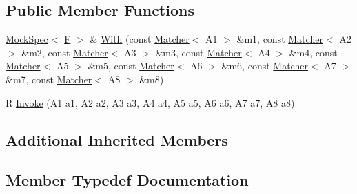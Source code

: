 \subsection*{Public Member Functions}
\begin{DoxyCompactItemize}
\item 
\hyperlink{classtesting_1_1internal_1_1_mock_spec}{Mock\+Spec}$<$ \hyperlink{classtesting_1_1internal_1_1_function_mocker_3_01_r_07_a1_00_01_a2_00_01_a3_00_01_a4_00_01_a5_00_01_a6_00_01_a7_00_01_a8_08_4_ad9749c93b0a17540778c5fa162a5fe6c}{F} $>$ \& \hyperlink{classtesting_1_1internal_1_1_function_mocker_3_01_r_07_a1_00_01_a2_00_01_a3_00_01_a4_00_01_a5_00_01_a6_00_01_a7_00_01_a8_08_4_ab2da711e67ed57fbd473cfc511935927}{With} (const \hyperlink{classtesting_1_1_matcher}{Matcher}$<$ A1 $>$ \&m1, const \hyperlink{classtesting_1_1_matcher}{Matcher}$<$ A2 $>$ \&m2, const \hyperlink{classtesting_1_1_matcher}{Matcher}$<$ A3 $>$ \&m3, const \hyperlink{classtesting_1_1_matcher}{Matcher}$<$ A4 $>$ \&m4, const \hyperlink{classtesting_1_1_matcher}{Matcher}$<$ A5 $>$ \&m5, const \hyperlink{classtesting_1_1_matcher}{Matcher}$<$ A6 $>$ \&m6, const \hyperlink{classtesting_1_1_matcher}{Matcher}$<$ A7 $>$ \&m7, const \hyperlink{classtesting_1_1_matcher}{Matcher}$<$ A8 $>$ \&m8)
\item 
R \hyperlink{classtesting_1_1internal_1_1_function_mocker_3_01_r_07_a1_00_01_a2_00_01_a3_00_01_a4_00_01_a5_00_01_a6_00_01_a7_00_01_a8_08_4_aff60c590ad791fa2a34751fe5a1e51c2}{Invoke} (A1 a1, A2 a2, A3 a3, A4 a4, A5 a5, A6 a6, A7 a7, A8 a8)
\end{DoxyCompactItemize}
\subsection*{Additional Inherited Members}


\subsection{Member Typedef Documentation}
\mbox{\label{classtesting_1_1internal_1_1_function_mocker_3_01_r_07_a1_00_01_a2_00_01_a3_00_01_a4_00_01_a5_00_01_a6_00_01_a7_00_01_a8_08_4_a57bc2be00815deac8964e2d2ae62fdd2}} 
